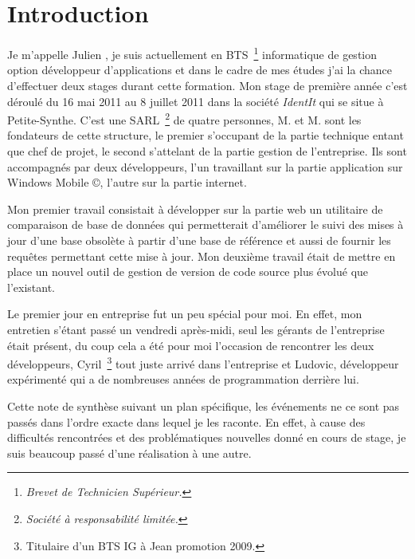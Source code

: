 \chapter{Introduction}

Je m'appelle Julien , je suis actuellement en BTS\,
\footnote{\emph{Brevet de Technicien Supérieur.}} informatique de gestion
option développeur d'applications et dans le cadre de mes études j'ai la chance
d'effectuer deux stages durant cette formation. Mon stage de première année
c'est déroulé du 16 mai 2011 au 8 juillet 2011 dans la société \emph{IdentIt}
qui se situe à Petite-Synthe. C'est une SARL\, \footnote{\emph{Société à
responsabilité limitée.}} de quatre personnes, M. et
M. sont les fondateurs de cette structure, le premier s'occupant de
la partie technique entant que chef de projet, le second s'attelant de la
partie gestion de l'entreprise. Ils sont accompagnés par deux développeurs,
l'un travaillant sur la partie application sur Windows Mobile \copyright,
l'autre sur la partie internet.

Mon premier travail consistait à développer sur la partie web un utilitaire de
comparaison de base de données qui permetterait d'améliorer le suivi des mises
à jour d'une base obsolète à partir d'une base de référence et aussi de fournir
les requêtes permettant cette mise à jour. Mon deuxième travail était de mettre
en place un nouvel outil de gestion de version de code source plus évolué que
l'existant.

Le premier jour en entreprise fut un peu spécial pour moi. En effet, mon
entretien s'étant passé un vendredi après-midi, seul les gérants de
l'entreprise était présent, du coup cela a été pour moi l'occasion de
rencontrer les deux développeurs, Cyril\, \footnote{Titulaire d'un BTS IG à
Jean  promotion 2009.} tout juste arrivé dans l'entreprise et
Ludovic, développeur expérimenté qui a de nombreuses années de programmation
derrière lui.

Cette note de synthèse suivant un plan spécifique, les événements ne ce sont
pas passés dans l'ordre exacte dans lequel je les raconte. En effet, à cause
des difficultés rencontrées et des problématiques nouvelles donné en cours de
stage, je suis beaucoup passé d'une réalisation à une autre.

\clearpage
